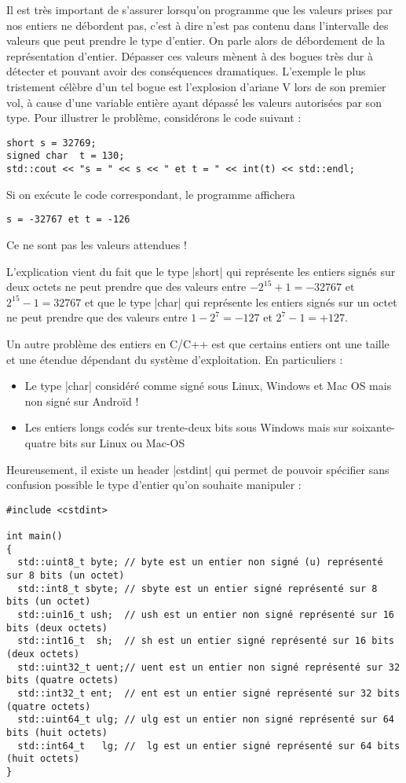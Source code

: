 Il est très important de s'assurer lorsqu'on programme que les valeurs prises par nos entiers ne débordent pas, c'est à dire n'est pas contenu dans l'intervalle des valeurs que peut prendre le type d'entier. On parle alors de débordement de la représentation d'entier. Dépasser ces valeurs mènent à des bogues très dur à détecter et pouvant avoir des conséquences dramatiques. L'exemple le plus tristement célèbre d'un tel bogue est l'explosion d'ariane V lors de son premier vol, à cause d'une variable entière ayant dépassé les valeurs autorisées par son type. Pour illustrer le problème, considérons le code suivant :
\begin{lstlisting}[caption=Débordement d'entier]
short s = 32769;
signed char  t = 130;
std::cout << "s = " << s << " et t = " << int(t) << std::endl;
\end{lstlisting}

Si on exécute le code correspondant, le programme affichera

\begin{verbatim}
s = -32767 et t = -126
\end{verbatim}

Ce ne sont pas les valeurs attendues !

L'explication vient du fait que le type |short| qui représente les entiers signés sur deux octets 
ne peut prendre que des valeurs entre $-2^{15}+1 = -32767$ et $2^{15}-1 = 32767$ et que
le type |char| qui représente les entiers signés sur un octet ne peut prendre que des valeurs entre
$1-2^{7}=-127$ et $2^{7}-1=+127$.

Un autre problème des entiers en C/C++ est que certains entiers ont une taille et une étendue dépendant du système d'exploitation. En particuliers :
\begin{itemize}
  \item Le type |char| considéré comme signé sous Linux, Windows et Mac OS mais non signé sur Androïd !
  \item Les entiers longs codés sur trente-deux bits sous Windows mais sur soixante-quatre bits sur Linux ou Mac-OS
\end{itemize}

Heureusement, il existe un header |cstdint| qui permet de pouvoir spécifier sans confusion possible le type d'entier qu'on souhaite manipuler :

\begin{lstlisting}[caption=Déclaration des entiers sans ambigüité]
#include <cstdint>

int main()
{
  std::uint8_t byte; // byte est un entier non signé (u) représenté sur 8 bits (un octet)
  std::int8_t sbyte; // sbyte est un entier signé représenté sur 8 bits (un octet)
  std::uin16_t ush;  // ush est un entier non signé représenté sur 16  bits (deux octets)
  std::int16_t  sh;  // sh est un entier signé représenté sur 16 bits (deux octets)
  std::uint32_t uent;// uent est un entier non signé représenté sur 32 bits (quatre octets)
  std::int32_t ent;  // ent est un entier signé représenté sur 32 bits (quatre octets)
  std::uint64_t ulg; // ulg est un entier non signé représenté sur 64 bits (huit octets)
  std::int64_t   lg; //  lg est un entier signé représenté sur 64 bits (huit octets)
}
\end{lstlisting}

